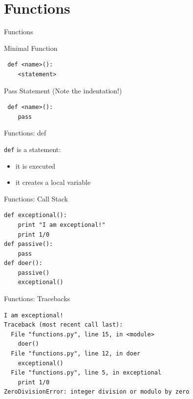 \documentclass{beamer}
\begin{document}
\section{Functions}


\begin{frame}[fragile]{Functions}

{\Large Minimal Function}

\begin{verbatim}
￼def <name>():
    <statement>
\end{verbatim}

\pause
\vspace{0.25in}
{\Large Pass Statement (Note the indentation!)}
\begin{verbatim}
￼def <name>():
    pass
\end{verbatim}


\end{frame}

\begin{frame}[fragile]{Functions: def}

{\large \verb+def+ is a statement:}
\begin{itemize}
  \item it is executed
  \item it creates a local variable
\end{itemize}

\vspace{0.2in}{\large￼function defs must be executed before the functions can be called}

\pause
\vspace{0.2in}{\large￼functions call functions -- this makes a stack -- that's all a trace back is}

\end{frame}

\begin{frame}[fragile]{Functions: Call Stack}

\begin{verbatim}
def exceptional():
    print "I am exceptional!"
    print 1/0
def passive():
    pass
def doer():
    passive()
    exceptional()
\end{verbatim}

\end{frame}

\begin{frame}[fragile]{Functions: Tracebacks}

\begin{verbatim}
I am exceptional!
Traceback (most recent call last):
  File "functions.py", line 15, in <module>
    doer()
  File "functions.py", line 12, in doer
    exceptional()
  File "functions.py", line 5, in exceptional
    print 1/0
ZeroDivisionError: integer division or modulo by zero
\end{verbatim}

\end{frame}
\end{document}
